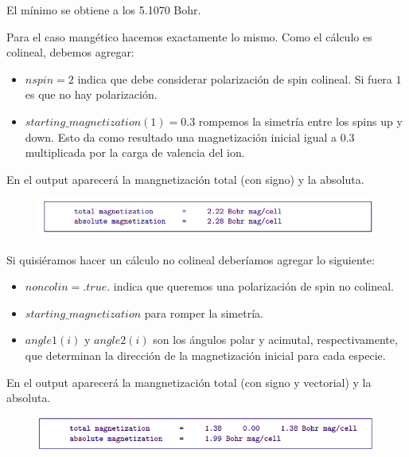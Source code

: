   El mínimo se obtiene a los 5.1070 Bohr.

  Para el caso mangético hacemos exactamente lo mismo. Como el cálculo es colineal, debemos agregar:
    \begin{itemize}
      \item $nspin=2$ indica que debe considerar polarización de spin colineal. Si fuera $1$ es que no hay polarización.
      \item $starting\_magnetization(1)=0.3$ rompemos la simetría entre los spins up y down. Esto da como resultado una magnetización inicial igual a 0.3 multiplicada por la carga de valencia del ion.
    \end{itemize}

  En el output aparecerá la mangnetización total (con signo) y la absoluta.
    \begin{figure}[H]
        \centering
        \includegraphics[scale = 0.6]{figs/D7/output_col.png}
    \end{figure}

  Si quisiéramos hacer un cálculo no colineal deberíamos agregar lo siguiente:
    \begin{itemize}
      \item $noncolin=.true.$ indica que queremos una polarización de spin no colineal.
      \item $starting\_magnetization$ para romper la simetría.
      \item $angle1(i)$ y $angle2(i)$ son los ángulos polar y acimutal, respectivamente, que determinan la dirección de la magnetización inicial para cada especie.
    \end{itemize}

    En el output aparecerá la mangnetización total (con signo y vectorial) y la absoluta.
      \begin{figure}[H]
          \centering
          \includegraphics[scale = 0.6]{figs/D7/output_nocol.png}
      \end{figure}

